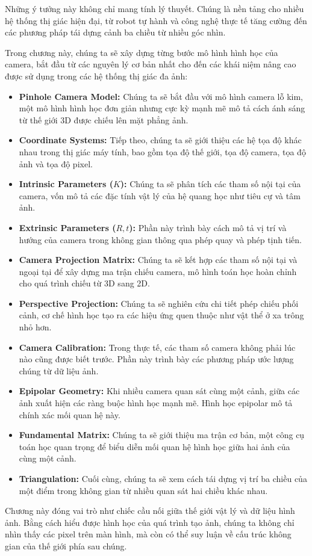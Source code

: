 Những ý tưởng này không chỉ mang tính lý thuyết. Chúng là nền tảng cho nhiều hệ thống thị giác hiện đại, từ robot tự hành và công nghệ thực tế tăng cường đến các phương pháp tái dựng cảnh ba chiều từ nhiều góc nhìn.

Trong chương này, chúng ta sẽ xây dựng từng bước mô hình hình học của camera, bắt đầu từ các nguyên lý cơ bản nhất cho đến các khái niệm nâng cao được sử dụng trong các hệ thống thị giác đa ảnh:

\begin{itemize}
	
	\item \textbf{Pinhole Camera Model:} Chúng ta sẽ bắt đầu với mô hình camera lỗ kim, một mô hình hình học đơn giản nhưng cực kỳ mạnh mẽ mô tả cách ánh sáng từ thế giới 3D được chiếu lên mặt phẳng ảnh.
	
	\item \textbf{Coordinate Systems:} Tiếp theo, chúng ta sẽ giới thiệu các hệ tọa độ khác nhau trong thị giác máy tính, bao gồm tọa độ thế giới, tọa độ camera, tọa độ ảnh và tọa độ pixel.
	
	\item \textbf{Intrinsic Parameters ($K$):} Chúng ta sẽ phân tích các tham số nội tại của camera, vốn mô tả các đặc tính vật lý của hệ quang học như tiêu cự và tâm ảnh.
	
	\item \textbf{Extrinsic Parameters ($R, t$):} Phần này trình bày cách mô tả vị trí và hướng của camera trong không gian thông qua phép quay và phép tịnh tiến.
	
	\item \textbf{Camera Projection Matrix:} Chúng ta sẽ kết hợp các tham số nội tại và ngoại tại để xây dựng ma trận chiếu camera, mô hình toán học hoàn chỉnh cho quá trình chiếu từ 3D sang 2D.
	
	\item \textbf{Perspective Projection:} Chúng ta sẽ nghiên cứu chi tiết phép chiếu phối cảnh, cơ chế hình học tạo ra các hiệu ứng quen thuộc như vật thể ở xa trông nhỏ hơn.
	
	\item \textbf{Camera Calibration:} Trong thực tế, các tham số camera không phải lúc nào cũng được biết trước. Phần này trình bày các phương pháp ước lượng chúng từ dữ liệu ảnh.
	
	\item \textbf{Epipolar Geometry:} Khi nhiều camera quan sát cùng một cảnh, giữa các ảnh xuất hiện các ràng buộc hình học mạnh mẽ. Hình học epipolar mô tả chính xác mối quan hệ này.
	
	\item \textbf{Fundamental Matrix:} Chúng ta sẽ giới thiệu ma trận cơ bản, một công cụ toán học quan trọng để biểu diễn mối quan hệ hình học giữa hai ảnh của cùng một cảnh.
	
	\item \textbf{Triangulation:} Cuối cùng, chúng ta sẽ xem cách tái dựng vị trí ba chiều của một điểm trong không gian từ nhiều quan sát hai chiều khác nhau.
	
\end{itemize}

Chương này đóng vai trò như chiếc cầu nối giữa thế giới vật lý và dữ liệu hình ảnh. Bằng cách hiểu được hình học của quá trình tạo ảnh, chúng ta không chỉ nhìn thấy các pixel trên màn hình, mà còn có thể suy luận về cấu trúc không gian của thế giới phía sau chúng.